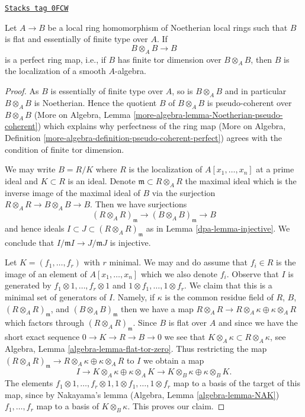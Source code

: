 \begin{lemma}
\label{dpa-lemma-local-perfect-diagonal}
\href{https://stacks.math.columbia.edu/tag/0FCW}{\texttt{Stacks tag 0FCW}}

Let $A \to B$ be a local ring homomorphism of Noetherian local rings such that
$B$ is flat and essentially of finite type over $A$. If
$$
B \otimes_A B \longrightarrow B
$$
is a perfect ring map, i.e., if $B$ has finite tor dimension over
$B \otimes_A B$, then $B$ is the localization of a smooth $A$-algebra.
\end{lemma}

\begin{proof}

As $B$ is essentially of finite type over $A$, so is $B \otimes_A B$ and
in particular $B \otimes_A B$ is Noetherian. Hence the quotient $B$ of
$B \otimes_A B$ is pseudo-coherent over $B \otimes_A B$
(More on Algebra, Lemma \ref{more-algebra-lemma-Noetherian-pseudo-coherent})
which explains why perfectness of the ring map (More on Algebra, Definition
\ref{more-algebra-definition-pseudo-coherent-perfect}) agrees with the
condition of finite tor dimension.

\medskip\noindent
We may write $B = R/K$ where $R$ is the localization of $A[x_1, \ldots, x_n]$
at a prime ideal and $K \subset R$ is an ideal. Denote
$\mathfrak m \subset R \otimes_A R$ the maximal ideal which is the inverse
image of the maximal ideal of $B$ via the surjection
$R \otimes_A R \to B \otimes_A B \to B$. Then we have surjections
$$
(R \otimes_A R)_\mathfrak m \to (B \otimes_A B)_\mathfrak m \to B
$$
and hence ideals $I \subset J \subset (R \otimes_A R)_\mathfrak m$
as in Lemma \ref{dpa-lemma-injective}. We conclude that
$I/\mathfrak m I \to J/\mathfrak m J$ is injective.

\medskip\noindent
Let $K = (f_1, \ldots, f_r)$ with $r$ minimal. We may and do assume that
$f_i \in R$ is the image of an element of $A[x_1, \ldots, x_n]$ which we
also denote $f_i$. Observe that $I$ is generated
by $f_1 \otimes 1, \ldots, f_r \otimes 1$ and
$1 \otimes f_1, \ldots, 1 \otimes f_r$. We claim that this is a minimal
set of generators of $I$. Namely, if $\kappa$ is the common residue field
of $R$, $B$, $(R \otimes_A R)_\mathfrak m$, and $(B \otimes_A B)_\mathfrak m$
then we have a map
$R \otimes_A R \to R \otimes_A \kappa \oplus \kappa \otimes_A R$
which factors through $(R \otimes_A R)_\mathfrak m$. Since $B$ is
flat over $A$ and since we have the short exact sequence
$0 \to K \to R \to B \to 0$ we see that
$K \otimes_A \kappa \subset R \otimes_A \kappa$, see
Algebra, Lemma \ref{algebra-lemma-flat-tor-zero}.
Thus restricting the map
$(R \otimes_A R)_\mathfrak m \to R \otimes_A \kappa \oplus \kappa \otimes_A R$
to $I$ we obtain a map
$$
I \to K \otimes_A \kappa \oplus \kappa \otimes_A K \to
K \otimes_B \kappa \oplus \kappa \otimes_B K.
$$
The elements
$f_1 \otimes 1, \ldots, f_r \otimes 1, 1 \otimes f_1, \ldots, 1 \otimes f_r$
map to a basis of the target of this map, since by Nakayama's lemma
(Algebra, Lemma \ref{algebra-lemma-NAK})
$f_1, \ldots, f_r$ map to a basis of $K \otimes_B \kappa$.
This proves our claim.


\end{proof}
